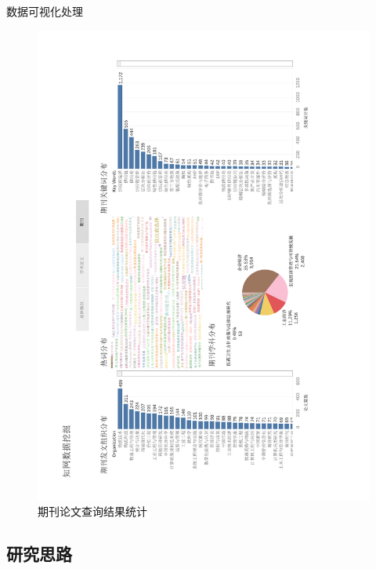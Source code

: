 \documentclass{beamer}
\begin{document}
\begin{frame}{数据可视化处理}
	\vspace{-7mm}
	\begin{figure}[h]
		\centering
		\includegraphics[height=1.4\textheight,trim=110 40 110 40,clip,angle=-90]{pic/data3.pdf}
		\caption{期刊论文查询结果统计}
	\end{figure}
\end{frame}

\subsection{研究思路}
\end{document}
